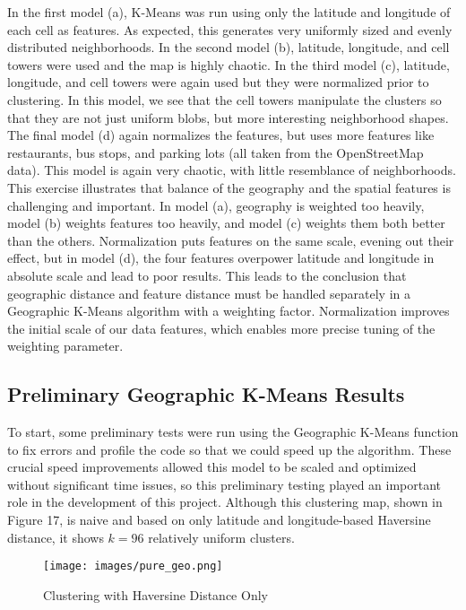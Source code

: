 \documentclass[times new roman,12pt]{article}
\begin{document}
In the first model (a), K-Means was run using only the latitude and longitude of each cell as features. As expected, this generates very uniformly sized and evenly distributed neighborhoods. In the second model (b), latitude, longitude, and cell towers were used and the map is highly chaotic. In the third model (c), latitude, longitude, and cell towers were again used but they were normalized prior to clustering. In this model, we see that the cell towers manipulate the clusters so that they are not just uniform blobs, but more interesting neighborhood shapes. The final model (d) again normalizes the features, but uses more features like restaurants, bus stops, and parking lots (all taken from the OpenStreetMap data). This model is again very chaotic, with little resemblance of neighborhoods. This exercise illustrates that balance of the geography and the spatial features is challenging and important. In model (a), geography is weighted too heavily, model (b) weights features too heavily, and model (c) weights them both better than the others. Normalization puts features on the same scale, evening out their effect, but in model (d), the four features overpower latitude and longitude in absolute scale and lead to poor results. This leads to the conclusion that geographic distance and feature distance must be handled separately in a Geographic K-Means algorithm with a weighting factor. Normalization improves the initial scale of our data features, which enables more precise tuning of the weighting parameter.

\subsection{Preliminary Geographic K-Means Results}

To start, some preliminary tests were run using the Geographic K-Means function to fix errors and profile the code so that we could speed up the algorithm. These crucial speed improvements allowed this model to be scaled and optimized without significant time issues, so this preliminary testing played an important role in the development of this project. Although this clustering map, shown in Figure 17, is naive and based on only latitude and longitude-based Haversine distance, it shows $k=96$ relatively uniform clusters. 

\begin{figure}[H]
\label{pure_geo}
\centering
  \texttt{[image: images/pure\_geo.png]}
  \caption{Clustering with Haversine Distance Only}
  \label{fig:pure_geo}
\end{figure}
\end{document}
